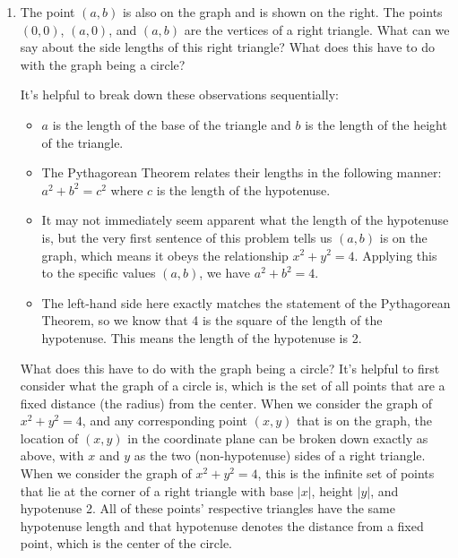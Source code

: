 \documentclass[main]{subfiles}
\begin{document}
\begin{enumerate}[resume]
\begin{enumerate}
    \item
    \begin{problem}
        The point $(a, b)$ is also on the graph and is shown on the right. The points $(0, 0)$, $(a, 0)$, and $(a, b)$ are the vertices of a right triangle. What can we say about the side lengths of this right triangle? What does this have to do with the graph being a circle?
    \end{problem}
    \pspace{\vfill}

    \begin{solution}
        It's helpful to break down these observations sequentially: 
        \begin{itemize}
            \item $a$ is the length of the base of the triangle and $b$ is the length of the height of the triangle.
            \item The Pythagorean Theorem relates their lengths in the following manner: $a^2+b^2 = c^2$ where $c$ is the length of the hypotenuse. 
            \item It may not immediately seem apparent what the length of the hypotenuse is, but the very first sentence of this problem tells us $(a,b)$ is on the graph, which means it obeys the relationship $x^2+y^2=4$. Applying this to the specific values $(a, b)$, we have $a^2+b^2 = 4$. 
            \item The left-hand side here exactly matches the statement of the Pythagorean Theorem, so we know that 4 is the square of the length of the hypotenuse. This means the length of the hypotenuse is 2.
            \end{itemize}
        What does this have to do with the graph being a circle? It's helpful to first consider what the graph of a circle is, which is the set of all points that are a fixed distance (the radius) from the center. When we consider the graph of $x^2+y^2 = 4$, and any corresponding point $(x,y)$ that is on the graph, the location of $(x,y)$ in the coordinate plane can be broken down exactly as above, with $x$ and $y$ as the two (non-hypotenuse) sides of a right triangle. When we consider the graph of $x^2+y^2 = 4$, this is the infinite set of points that lie at the corner of a right triangle with base $|x|$, height $|y|$, and hypotenuse 2. All of these points' respective triangles have the same hypotenuse length and that hypotenuse denotes the distance from a fixed point, which is the center of the circle.
    \end{solution}
\begin{center}

\end{center}
\end{enumerate}
\end{enumerate}
\end{document}
